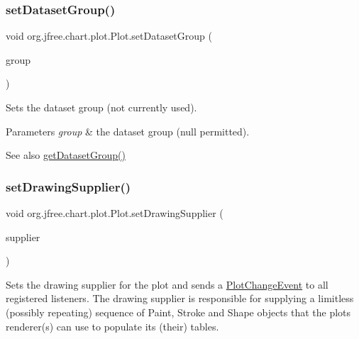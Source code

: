 \subsubsection{\texorpdfstring{set\+Dataset\+Group()}{setDatasetGroup()}}
{\footnotesize\ttfamily void org.\+jfree.\+chart.\+plot.\+Plot.\+set\+Dataset\+Group (\begin{DoxyParamCaption}\item[{\mbox{\hyperlink{classorg_1_1jfree_1_1data_1_1general_1_1_dataset_group}{Dataset\+Group}}}]{group }\end{DoxyParamCaption})\hspace{0.3cm}{\ttfamily [protected]}}

Sets the dataset group (not currently used).


\begin{DoxyParams}{Parameters}
{\em group} & the dataset group ({\ttfamily null} permitted).\\
\hline
\end{DoxyParams}
\begin{DoxySeeAlso}{See also}
\mbox{\hyperlink{classorg_1_1jfree_1_1chart_1_1plot_1_1_plot_ad2dfcb9fbeb29710b376aa4f9fb3888e}{get\+Dataset\+Group()}} 
\end{DoxySeeAlso}
\mbox{\label{classorg_1_1jfree_1_1chart_1_1plot_1_1_plot_a079267deccd4488e8110f2ce847d01a5}} 
\subsubsection{\texorpdfstring{set\+Drawing\+Supplier()}{setDrawingSupplier()}\hspace{0.1cm}{\footnotesize\ttfamily [1/2]}}
{\footnotesize\ttfamily void org.\+jfree.\+chart.\+plot.\+Plot.\+set\+Drawing\+Supplier (\begin{DoxyParamCaption}\item[{\mbox{\hyperlink{interfaceorg_1_1jfree_1_1chart_1_1plot_1_1_drawing_supplier}{Drawing\+Supplier}}}]{supplier }\end{DoxyParamCaption})}

Sets the drawing supplier for the plot and sends a \mbox{\hyperlink{}{Plot\+Change\+Event}} to all registered listeners. The drawing supplier is responsible for supplying a limitless (possibly repeating) sequence of {\ttfamily Paint}, {\ttfamily Stroke} and {\ttfamily Shape} objects that the plot\textquotesingle{}s renderer(s) can use to populate its (their) tables.


